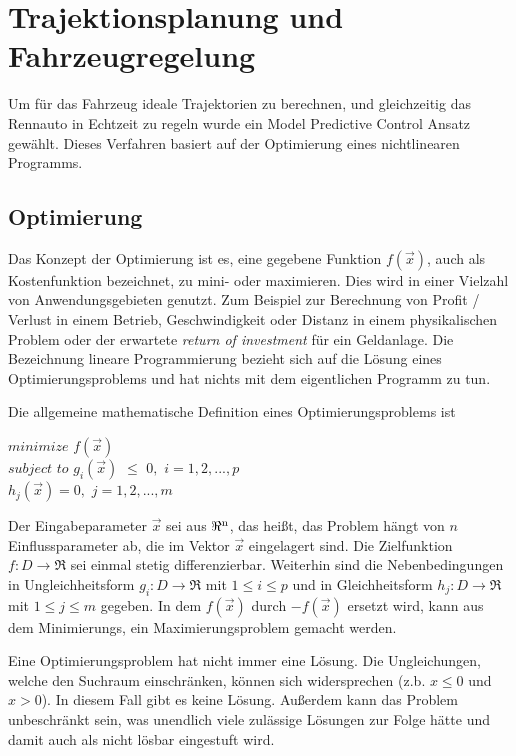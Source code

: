 \documentclass{like}
\begin{document}
\chapter{Trajektionsplanung und Fahrzeugregelung}

Um für das Fahrzeug ideale Trajektorien zu berechnen, und gleichzeitig das Rennauto in Echtzeit zu regeln wurde ein Model Predictive Control Ansatz gewählt. Dieses Verfahren basiert auf der Optimierung eines nichtlinearen Programms.


\section{Optimierung}
Das Konzept der Optimierung ist es, eine gegebene Funktion \(f(\vec{x})\), auch als Kostenfunktion bezeichnet, zu mini- oder maximieren. 
Dies wird in einer Vielzahl von Anwendungsgebieten genutzt.
Zum Beispiel zur Berechnung von Profit / Verlust in einem Betrieb, Geschwindigkeit oder Distanz in einem physikalischen Problem oder der erwartete \textit{return of investment} für ein Geldanlage.  
Die Bezeichnung lineare Programmierung bezieht sich auf die Lösung eines  Optimierungsproblems und hat nichts mit dem eigentlichen Programm zu tun.

Die allgemeine mathematische Definition eines Optimierungsproblems ist

 $minimize$  
  \noindent\hspace*{3mm}%
 $f(\vec{x}) $ \\
 $subject$  $to$ 
 \noindent\hspace*{3mm}%
 $g_i(\vec{x})$ $\leq$ $0,$ $i=1,2,...,p$  \\
 \noindent\hspace*{22mm}%
 $h_j(\vec{x})= 0,$ $j= 1,2,...,m$\\ 
 \noindent\hspace*{22mm}%

 
 Der Eingabeparameter $\vec{x}$ sei aus $\Re \textsuperscript{n} $, das heißt, das Problem hängt von \(n\) Einflussparameter ab, die im Vektor $\vec{x}$ eingelagert sind. Die Zielfunktion $f:D \rightarrow \Re $ sei einmal stetig differenzierbar. Weiterhin sind die Nebenbedingungen in Ungleichheitsform $g_i:D \rightarrow \Re$ mit $1\leq i \leq p$ und in Gleichheitsform $h_j:D \rightarrow \Re$ mit $1\leq j \leq m$ gegeben.
 In dem \(f(\vec{x})\) durch \(-f(\vec{x})\) ersetzt wird, kann aus dem Minimierungs, ein Maximierungsproblem gemacht werden.  
  
 Eine Optimierungsproblem hat nicht immer eine Lösung. Die Ungleichungen, welche den Suchraum einschränken, können sich widersprechen (z.b. $x \leq 0 $ und $x > 0$). In diesem Fall gibt es keine Lösung. Außerdem kann das Problem unbeschränkt sein, was unendlich viele zulässige Lösungen zur Folge hätte und damit auch als nicht lösbar eingestuft wird. 
 
\end{document}
